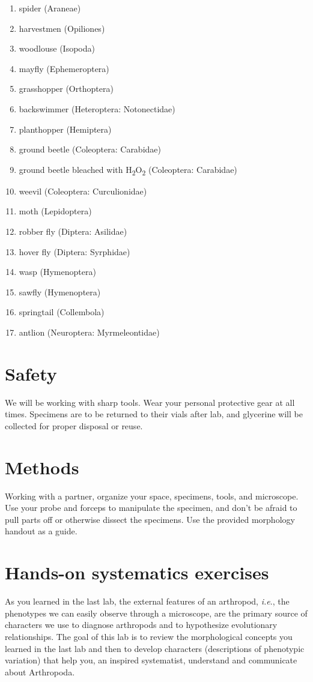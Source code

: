 \documentclass[letterpaper, 11pt]{article}
\begin{document}
\begin{enumerate}
\item spider (Araneae)
\item harvestmen (Opiliones)
\item woodlouse (Isopoda)
\item mayfly (Ephemeroptera)
\item grasshopper (Orthoptera)
\item backswimmer (Heteroptera: Notonectidae)
\item planthopper (Hemiptera)
\item ground beetle (Coleoptera: Carabidae)
\item ground beetle bleached with H\textsubscript{2}O\textsubscript{2} (Coleoptera: Carabidae)
\item weevil (Coleoptera: Curculionidae)
\item moth (Lepidoptera)
\item robber fly (Diptera: Asilidae)
\item hover fly (Diptera: Syrphidae)
\item wasp (Hymenoptera)
\item sawfly (Hymenoptera)
\item springtail (Collembola)
\item antlion (Neuroptera: Myrmeleontidae)
\end{enumerate}

\section*{Safety}
We will be working with sharp tools. Wear your personal protective gear at all times. Specimens are to be returned to their vials after lab, and glycerine will be collected for proper disposal or reuse.

\section*{Methods}
Working with a partner, organize your space, specimens, tools, and microscope. Use your probe and forceps to manipulate the specimen, and don’t be afraid to pull parts off or otherwise dissect the specimens. Use the provided morphology handout as a guide.

\section{Hands-on systematics exercises}
As you learned in the last lab, the external features of an arthropod, \textit{i.e}., the phenotypes we can easily observe through a microscope, are the primary source of characters we use to diagnose arthropods and to hypothesize evolutionary relationships. The goal of this lab is to review the morphological concepts you learned in the last lab and then to develop characters (descriptions of phenotypic variation) that help you, an inspired systematist, understand and communicate about Arthropoda.
\end{document}
